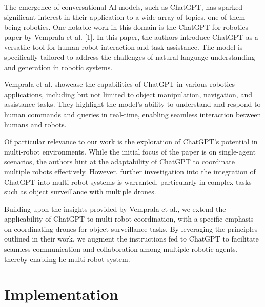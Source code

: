 \documentclass[journal]{IEEEtran}
\begin{document}
The emergence of conversational AI models, such as ChatGPT, has sparked significant interest in their application to a wide array of topics, one of them being robotics. One notable work in this domain is the ChatGPT for robotics paper by Vemprala et al. [1]. In this paper, the authors introduce ChatGPT as a versatile tool for human-robot interaction and task assistance. The model is specifically tailored to address the challenges of natural language understanding and generation in robotic systems.

Vemprala et al. showcase the capabilities of ChatGPT in various robotics applications, including but not limited to object manipulation, navigation, and assistance tasks. They highlight the model's ability to understand and respond to human commands and queries in real-time, enabling seamless interaction between humans and robots.

Of particular relevance to our work is the exploration of ChatGPT's potential in multi-robot environments. While the initial focus of the paper is on single-agent scenarios, the authors hint at the adaptability of ChatGPT to coordinate multiple robots effectively. However, further investigation into the integration of ChatGPT into multi-robot systems is warranted, particularly in complex tasks such as object surveillance with multiple drones.

Building upon the insights provided by Vemprala et al., we extend the applicability of ChatGPT to multi-robot coordination, with a specific emphasis on coordinating drones for object surveillance tasks. By leveraging the principles outlined in their work, we augment the instructions fed to ChatGPT to facilitate seamless communication and collaboration among multiple robotic agents, thereby enabling he multi-robot system.

\section{Implementation}
\end{document}
